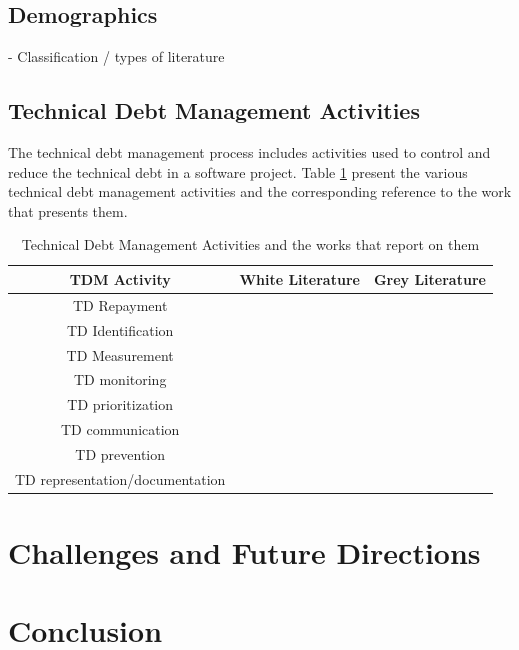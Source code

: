 \documentclass[manuscript]{acmart}
\begin{document}
\subsection{Demographics}
- Classification / types of literature

\subsection{Technical Debt Management Activities}
The technical debt management process includes activities used to control and reduce the technical debt in a software project. Table \ref{tab:TDMactivities} present the various technical debt management activities and the corresponding reference to the work that presents them.

\begin{table}[h!]
    \caption{Technical Debt Management Activities and the works that report on them}
  \label{tab:TDMactivities}
\centering
\begin{tabular}{|c|c|c|}
    \hline
    TDM Activity & White Literature & Grey Literature \\ \hline
    TD Repayment &  &  \\ \hline
    TD Identification & ~\cite{Klotins2018/3183519.3183539} & \\ \hline
    TD Measurement & & \\ \hline
    TD monitoring & ~\cite{Besker2018} & \\ \hline
 TD prioritization & & \\ \hline
TD communication & & ~\cite{FowlerBottlenecks} \\ \hline
TD prevention & ~\cite{SanchezGordon2016}& \\ \hline
TD representation/documentation & & \\ \hline
    \end{tabular}
\end{table}

\section{Challenges and Future Directions}


\section{Conclusion}




\balance
%



% 
\end{document}
